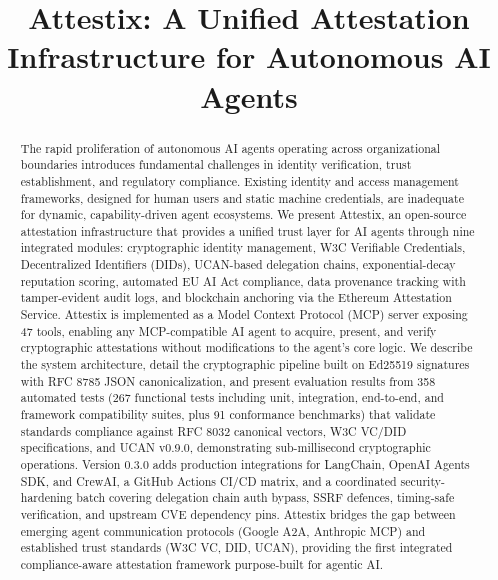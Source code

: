 \documentclass[conference]{IEEEtran}
\begin{document}
\title{Attestix: A Unified Attestation Infrastructure for Autonomous AI Agents}

\author{
}

\maketitle

\begin{abstract}
The rapid proliferation of autonomous AI agents operating across organizational boundaries introduces fundamental challenges in identity verification, trust establishment, and regulatory compliance. Existing identity and access management frameworks, designed for human users and static machine credentials, are inadequate for dynamic, capability-driven agent ecosystems. We present Attestix, an open-source attestation infrastructure that provides a unified trust layer for AI agents through nine integrated modules: cryptographic identity management, W3C Verifiable Credentials, Decentralized Identifiers (DIDs), UCAN-based delegation chains, exponential-decay reputation scoring, automated EU AI Act compliance, data provenance tracking with tamper-evident audit logs, and blockchain anchoring via the Ethereum Attestation Service. Attestix is implemented as a Model Context Protocol (MCP) server exposing 47 tools, enabling any MCP-compatible AI agent to acquire, present, and verify cryptographic attestations without modifications to the agent's core logic. We describe the system architecture, detail the cryptographic pipeline built on Ed25519 signatures with RFC 8785 JSON canonicalization, and present evaluation results from 358 automated tests (267 functional tests including unit, integration, end-to-end, and framework compatibility suites, plus 91 conformance benchmarks) that validate standards compliance against RFC 8032 canonical vectors, W3C VC/DID specifications, and UCAN v0.9.0, demonstrating sub-millisecond cryptographic operations. Version 0.3.0 adds production integrations for LangChain, OpenAI Agents SDK, and CrewAI, a GitHub Actions CI/CD matrix, and a coordinated security-hardening batch covering delegation chain auth bypass, SSRF defences, timing-safe verification, and upstream CVE dependency pins. Attestix bridges the gap between emerging agent communication protocols (Google A2A, Anthropic MCP) and established trust standards (W3C VC, DID, UCAN), providing the first integrated compliance-aware attestation framework purpose-built for agentic AI.
\end{abstract}
\end{document}
